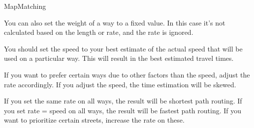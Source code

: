 MapMatching \autocite[]{Yuan2020}









You can also set the weight of a way to a fixed value. In this case it's not calculated based on the length or rate, and the rate is ignored.

You should set the speed to your best estimate of the actual speed that will be used on a particular way. This will result in the best estimated travel times.

If you want to prefer certain ways due to other factors than the speed, adjust the rate accordingly. If you adjust the speed, the time estimation will be skewed.

If you set the same rate on all ways, the result will be shortest path routing. If you set rate = speed on all ways, the result will be fastest path routing. If you want to prioritize certain streets, increase the rate on these.


